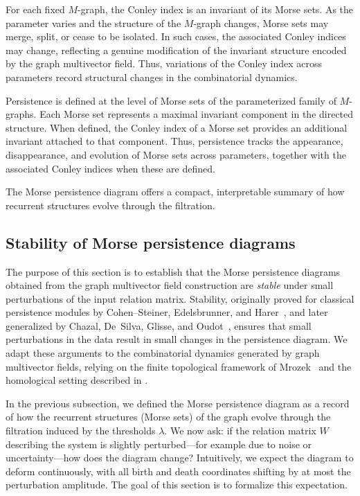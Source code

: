 \documentclass{article}
\theoremstyle{definition}
\theoremstyle{plain}
\theoremstyle{remark}
\newcommand{\1}{\mathbbm{1}}  %
\begin{document}
For each fixed $M$-graph, the Conley index is an invariant of its Morse sets. As the parameter varies and the structure of the $M$-graph
changes, Morse sets may merge, split, or cease to be isolated.
In such cases, the associated Conley indices may change, reflecting a genuine
modification of the invariant structure encoded by the graph multivector field.
Thus, variations of the Conley index across parameters record structural
changes in the combinatorial dynamics.


Persistence is defined at the level of Morse sets of the parameterized
family of $M$-graphs. Each Morse set represents a maximal invariant
component in the directed structure. When defined, the Conley index
of a Morse set provides an additional invariant attached to that component.
Thus, persistence tracks the appearance, disappearance, and evolution
of Morse sets across parameters, together with the associated Conley
indices when these are defined.

\medskip
The Morse persistence diagram offers a compact, interpretable summary of
how recurrent structures evolve through the filtration. 












\subsection{Stability of Morse persistence diagrams}
\label{sec:stability} 

The purpose of this section is to establish that the Morse persistence
diagrams obtained from the graph multivector field construction are
\emph{stable} under small perturbations of the input relation matrix.
Stability, originally proved for classical persistence modules by
Cohen--Steiner, Edelsbrunner, and Harer~\cite{cohen2005stability}, and
later generalized by Chazal, De~Silva, Glisse, and
Oudot~\cite{chazal2016structure}, ensures that small perturbations in the
data result in small changes in the persistence diagram.
We adapt these arguments to the combinatorial dynamics generated by
graph multivector fields, relying on the finite topological framework of
Mrozek~\cite{mrozek2017conley} and the homological setting described in
\cite{kaczynski2004computational}.
 
In the previous subsection, we defined the Morse persistence diagram as
a record of how the recurrent structures (Morse sets) of the graph evolve
through the filtration induced by the thresholds $\lambda$.
We now ask: if the relation matrix $W$ describing the system is slightly
perturbed—for example due to noise or uncertainty—how does the diagram
change?
Intuitively, we expect the diagram to deform continuously, with all birth
and death coordinates shifting by at most the perturbation amplitude.
The goal of this section is to formalize this expectation.
\end{document}
